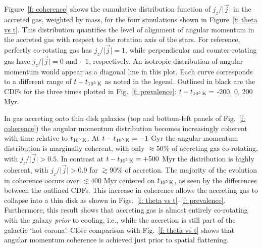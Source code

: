 \documentclass[fleqn,usenatbib]{mnras}
\newcommand{\tcon}{t_{10^5\,{\rm K}}}
\begin{document}
Figure~\ref{f: coherence} shows the cumulative distribution function of $j_z / \vert \vec j \vert$ in the accreted gas, weighted by mass, for the four simulations shown in Figure~\ref{f: theta vs t}.
This distribution quantifies the level of alignment of angular momentum in the accreted gas with respect to the rotation axis of the stars.
For reference, perfectly co-rotating gas has $j_z / \vert \vec j \vert = 1$, while perpendicular and counter-rotating gas have $j_z / \vert \vec j \vert = 0$ and $-1$, respectively.
An isotropic distribution of angular momentum would appear as a diagonal line in this plot. 
Each curve corresponds to a different range of $t - \tcon$ as noted in the legend. 
Outlined in black are the CDFs for the three times plotted in Fig.~\ref{f: prevalence}: $t - \tcon =$ -200, 0, 200 Myr.

In gas accreting onto thin disk galaxies (top and bottom-left panels of Fig.~\ref{f: coherence})  the angular momentum distribution becomes increasingly coherent with time relative to $\tcon$.
At $t-\tcon=-1$ Gyr the angular momentum distribution is marginally coherent, with only $\approx50\%$ of accreting gas co-rotating, with $j_z/\vert \vec j \vert > 0.5$.
In contrast at $t-\tcon=+500$ Myr the distribution is highly coherent, with $j_z/\vert \vec j \vert > 0.9$ for $\gtrsim 90\%$ of accretion.
The majority of the evolution in coherence occurs over $\lesssim 400$ Myr centered on $\tcon$, as seen by the differences between the outlined CDFs.
This increase in coherence allows the accreting gas to collapse into a thin disk as shown in Figs.~\ref{f: theta vs t}--\ref{f: prevalence}.
Furthermore, this result shows that accreting gas is almost entirely co-rotating with the galaxy {\em prior} to cooling, i.e., while the accretion is still part of the galactic `hot corona'. 
Close comparison with Fig.~\ref{f: theta vs t} shows that angular momentum coherence is achieved just prior to spatial flattening. 

\end{document}
